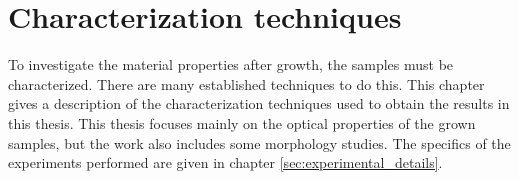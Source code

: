 
\chapter{Characterization techniques}
\label{sec:characterization}
To investigate the material properties after growth, the samples must be characterized. There are many established techniques to do this. This chapter gives a description of the characterization techniques used to obtain the results in this thesis. This thesis focuses mainly on the optical properties of the grown samples, but the work also includes some morphology studies. The specifics of the experiments performed are given in chapter \ref{sec:experimental_details}.



%

